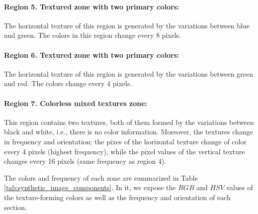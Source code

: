 \paragraph{Region 5. Textured zone with two primary colors:}
The horizontal texture of this region is generated by the variations between blue and green. The colors in this region change every 8 pixels. 

\paragraph{Region 6. Textured zone with two primary colors:}
The horizontal texture of this region is generated by the variations between green and red. The colors change every 4 pixels.

\paragraph{Region 7. Colorless mixed textures zone:}
This region contains two textures, both of them formed by the variations between black and white, i.e., there is no color information. Moreover, the textures change in frequency and orientation; the pixes of the horizontal texture change of color every 4 pixels (highest frequency), while the pixel values of the vertical texture changes every 16 pixels (same frequency as region 4).

The colors and frequency of each zone are summarized in Table \ref{tab:synthetic_image_components}. In it, we expose the $RGB$ and $HSV$ values of the texture-forming colors as well as the frequency and orientation of each section.


